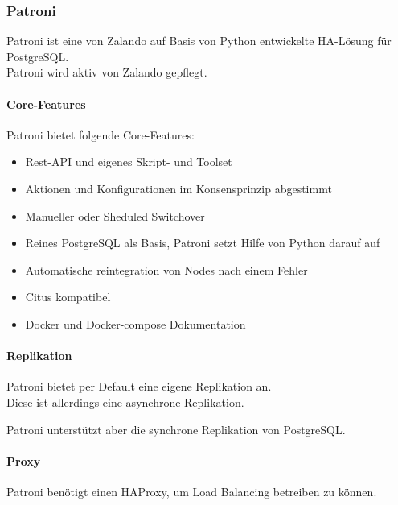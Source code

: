 
\begin{flushleft}
    \subsubsection{Patroni}
    Patroni ist eine von Zalando auf Basis von Python entwickelte HA-Lösung für \Gls{PostgreSQL}.\\
    Patroni wird aktiv von Zalando gepflegt.
\end{flushleft}
\begin{flushleft}
    \paragraph{Core-Features}
    Patroni bietet folgende Core-Features:
    \begin{itemize}
        \item Rest-API und eigenes Skript- und Toolset
        \item Aktionen und Konfigurationen im Konsensprinzip abgestimmt
        \item Manueller oder Sheduled Switchover
        \item Reines PostgreSQL als Basis, Patroni setzt Hilfe von Python darauf auf
        \item Automatische reintegration von Nodes nach einem Fehler
        \item Citus kompatibel
        \item Docker und Docker-compose Dokumentation
    \end{itemize}
\end{flushleft}
\begin{flushleft}
    \paragraph{Replikation}
    Patroni bietet per Default eine eigene Replikation an.\\
    Diese ist allerdings eine asynchrone Replikation.
\begin{flushleft}
    Patroni unterstützt aber die synchrone Replikation von \Gls{PostgreSQL}.
\end{flushleft}
\end{flushleft}
\begin{flushleft}
    \paragraph{Proxy}
    Patroni benötigt einen \Gls{HAProxy}, um Load Balancing betreiben zu können\cite{VYXTI7BS}.
\end{flushleft}
